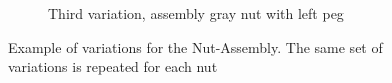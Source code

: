 \begin{figure}[htb]
\begin{subfigure}[b]{0.4\textwidth}
        \caption{Third variation, assembly gray nut with left peg}
        \label{fig:third_variation_nut}
    \end{subfigure}
    \caption{Example of variations for the Nut-Assembly. The same set of variations is repeated for each nut}
    \label{fig:examples_of_variations_for_nut_assembly}
\end{figure}